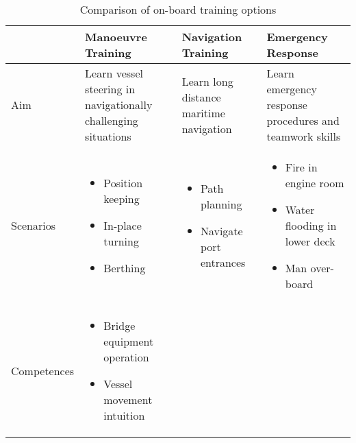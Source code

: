 \begin{table}
\centering
\caption{Comparison of on-board training options}
\label{tab:trainingoptions}
\begin{tabular}{@{}p{2.3cm}|p{3.4cm}|p{3.4cm}|p{3.4cm}|@{}}
\toprule
\multicolumn{1}{c|}{ } & \multicolumn{1}{P{3cm}|}{\textbf{Manoeuvre Training}} & \multicolumn{1}{P{3cm}|}{\textbf{Navigation Training}} & \multicolumn{1}{P{2.5cm}|}{\textbf{Emergency Response}} \\ 
\hline
Aim & Learn vessel steering in navigationally challenging situations & Learn long distance maritime navigation & Learn emergency response procedures and teamwork skills \\
\hline
Scenarios &
\vspace{-2mm} \begin{itemize}[leftmargin=*,topsep=0pt,partopsep=0pt,align=left,itemsep=0.05cm]
\renewcommand{\labelitemi}{\tiny\listsymb} 
\item Position keeping  
\item In-place turning
\item Berthing  
\end{itemize}
&\vspace{-2mm} \begin{itemize}[leftmargin=*,topsep=0pt,partopsep=0pt,align=left,itemsep=0cm]
\renewcommand{\labelitemi}{\tiny\listsymb} 
\item Path planning 
\item Navigate port entrances
\end{itemize} \vspace{-\baselineskip}
& \vspace{-2mm} \begin{itemize}[leftmargin=*,topsep=0pt,partopsep=0pt,align=left,itemsep=0cm]
\renewcommand{\labelitemi}{\tiny\listsymb} 
\item Fire in engine room 
\item Water flooding in lower deck
\item Man over-board
\end{itemize} \vspace{-\baselineskip} \\
\hline
Competences & \vspace{-2mm}\begin{itemize}[leftmargin=*,topsep=0pt,partopsep=0pt,align=left,itemsep=0cm]
\renewcommand{\labelitemi}{\tiny\listsymb} 
\item Bridge equipment operation
\item Vessel movement intuition

\end{itemize}
\end{tabular}
\end{table}
